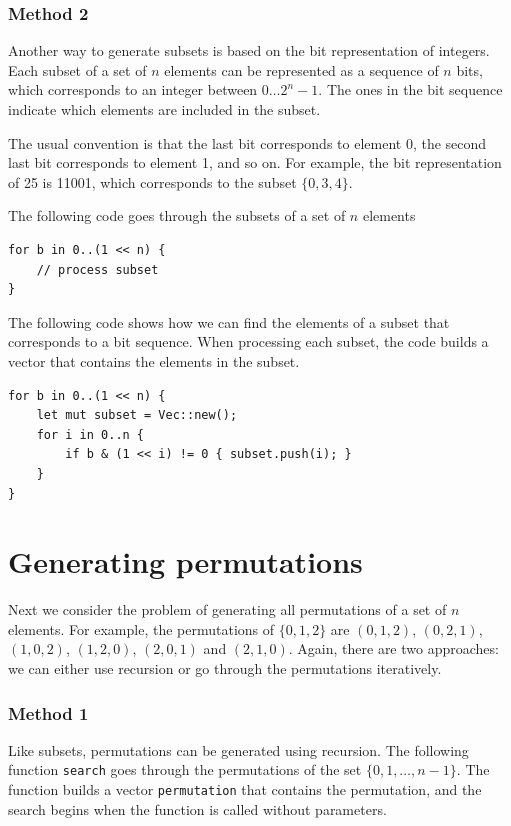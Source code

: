 \subsubsection{Method 2}

Another way to generate subsets is based on
the bit representation of integers.
Each subset of a set of $n$ elements
can be represented as a sequence of $n$ bits,
which corresponds to an integer between $0 \ldots 2^n-1$.
The ones in the bit sequence indicate
which elements are included in the subset.

The usual convention is that
the last bit corresponds to element 0,
the second last bit corresponds to element 1,
and so on.
For example, the bit representation of 25
is 11001, which corresponds to the subset $\{0,3,4\}$.

The following code goes through the subsets
of a set of $n$ elements

\begin{lstlisting}
for b in 0..(1 << n) {
    // process subset
}
\end{lstlisting}

The following code shows how we can find
the elements of a subset that corresponds to a bit sequence.
When processing each subset,
the code builds a vector that contains the
elements in the subset.

\begin{lstlisting}
for b in 0..(1 << n) {
    let mut subset = Vec::new();
    for i in 0..n {
        if b & (1 << i) != 0 { subset.push(i); }
    }
}
\end{lstlisting}

\section{Generating permutations}


Next we consider the problem of generating
all permutations of a set of $n$ elements.
For example, the permutations of $\{0,1,2\}$ are
$(0,1,2)$, $(0,2,1)$, $(1,0,2)$, $(1,2,0)$,
$(2,0,1)$ and $(2,1,0)$.
Again, there are two approaches:
we can either use recursion or go through the
permutations iteratively.

\subsubsection{Method 1}

Like subsets, permutations can be generated
using recursion.
The following function \texttt{search} goes
through the permutations of the set $\{0,1,\ldots,n-1\}$.
The function builds a vector \texttt{permutation}
that contains the permutation,
and the search begins when the function is
called without parameters.

